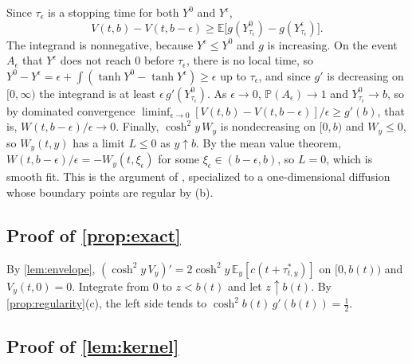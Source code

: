 \documentclass[11pt]{article}
\theoremstyle{definition}
\theoremstyle{remark}
\newcommand{\E}{\mathbb{E}}
\renewcommand{\P}{\mathbb{P}}
\begin{document}
Since $\tau_\epsilon$ is a stopping time for both $Y^0$ and $Y^\epsilon$,
\begin{equation}
  V(t, b) - V(t, b - \epsilon) \ge \E\bigl[g(Y^0_{\tau_\epsilon}) - g(Y^\epsilon_{\tau_\epsilon})\bigr].
\end{equation}
The integrand is nonnegative, because $Y^\epsilon \le Y^0$ and $g$ is increasing. On the event
$A_\epsilon$ that $Y^\epsilon$ does not reach 0 before $\tau_\epsilon$, there is no local time, so
$Y^0 - Y^\epsilon = \epsilon + \int(\tanh Y^0 - \tanh Y^\epsilon) \ge \epsilon$ up to
$\tau_\epsilon$, and since $g'$ is decreasing on $[0, \infty)$ the integrand is at least
$\epsilon\, g'(Y^0_{\tau_\epsilon})$. As $\epsilon \to 0$, $\P(A_\epsilon) \to 1$ and
$Y^0_{\tau_\epsilon} \to b$, so by dominated convergence
$\liminf_{\epsilon \to 0} [V(t, b) - V(t, b - \epsilon)]/\epsilon \ge g'(b)$, that is,
$W(t, b - \epsilon)/\epsilon \to 0$. Finally, $\cosh^2 y\,W_y$ is nondecreasing on $[0, b)$ and
$W_y \le 0$, so $W_y(t, y)$ has a limit $L \le 0$ as $y \uparrow b$. By the mean value theorem,
$W(t, b - \epsilon)/\epsilon = -W_y(t, \xi_\epsilon)$ for some $\xi_\epsilon \in (b - \epsilon, b)$,
so $L = 0$, which is smooth fit. This is the argument of \citet{deangelis2020}, specialized to a
one-dimensional diffusion whose boundary points are regular by (b).

\subsection{Proof of \texorpdfstring{\cref{prop:exact}}{Proposition }}

By \cref{lem:envelope}, $(\cosh^2 y\,V_y)' = 2\cosh^2 y\,\E_y[c(t + \tau^*_{t,y})]$ on $[0, b(t))$
and $V_y(t, 0) = 0$. Integrate from 0 to $z < b(t)$ and let $z \uparrow b(t)$. By
\cref{prop:regularity}(c), the left side tends to $\cosh^2 b(t)\, g'(b(t)) = \tfrac12$.

\subsection{Proof of \texorpdfstring{\cref{lem:kernel}}{Lemma }}
\end{document}
